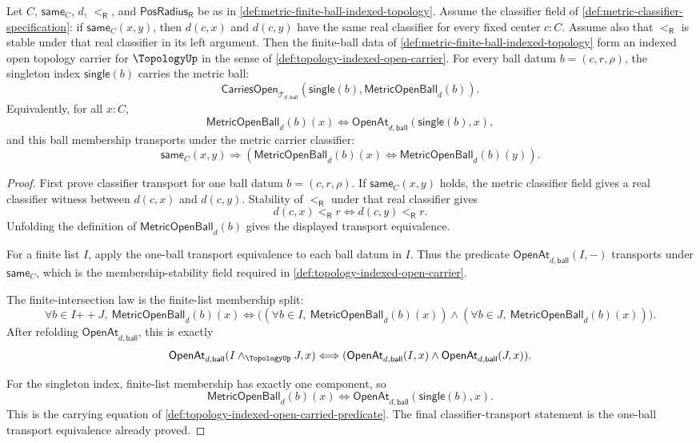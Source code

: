 \begin{theorem}
\label{thm:metric-balls-instantiate-indexed-topology-opens}
Let $C$, $\mathsf{same}_C$, $d$, $<_{\mathsf R}$, and $\mathsf{PosRadius}_{\mathsf R}$ be as in \autoref{def:metric-finite-ball-indexed-topology}. Assume the classifier field of \autoref{def:metric-classifier-specification}: if $\mathsf{same}_C(x,y)$, then $d(c,x)$ and $d(c,y)$ have the same real classifier for every fixed center $c:C$. Assume also that $<_{\mathsf R}$ is stable under that real classifier in its left argument. Then the finite-ball data of \autoref{def:metric-finite-ball-indexed-topology} form an indexed open topology carrier for $\TopologyUp$ in the sense of \autoref{def:topology-indexed-open-carrier}. For every ball datum $b=(c,r,\rho)$, the singleton index $\mathsf{single}(b)$ carries the metric ball:
$$
\mathsf{CarriesOpen}_{\mathcal{T}_{d,\mathsf{ball}}}
(\mathsf{single}(b),\mathsf{MetricOpenBall}_d(b)).
$$
Equivalently, for all $x:C$,
$$
\mathsf{MetricOpenBall}_d(b)(x)
\Longleftrightarrow
\mathsf{OpenAt}_{d,\mathsf{ball}}(\mathsf{single}(b),x),
$$
and this ball membership transports under the metric carrier classifier:
$$
\mathsf{same}_C(x,y)
\Longrightarrow
(\mathsf{MetricOpenBall}_d(b)(x)\Longleftrightarrow\mathsf{MetricOpenBall}_d(b)(y)).
$$
\end{theorem}
\begin{proof}
First prove classifier transport for one ball datum $b=(c,r,\rho)$. If $\mathsf{same}_C(x,y)$ holds, the metric classifier field gives a real classifier witness between $d(c,x)$ and $d(c,y)$. Stability of $<_{\mathsf R}$ under that real classifier gives
$$
d(c,x)<_{\mathsf R}r
\Longleftrightarrow
 d(c,y)<_{\mathsf R}r.
$$
Unfolding the definition of $\mathsf{MetricOpenBall}_d(b)$ gives the displayed transport equivalence.

For a finite list $I$, apply the one-ball transport equivalence to each ball datum in $I$. Thus the predicate $\mathsf{OpenAt}_{d,\mathsf{ball}}(I,-)$ transports under $\mathsf{same}_C$, which is the membership-stability field required in \autoref{def:topology-indexed-open-carrier}.

The finite-intersection law is the finite-list membership split:
$$
\forall b\in I\mathbin{+\!\!+}J,\ \mathsf{MetricOpenBall}_d(b)(x)
\Longleftrightarrow
\bigl((\forall b\in I,\ \mathsf{MetricOpenBall}_d(b)(x))\wedge
(\forall b\in J,\ \mathsf{MetricOpenBall}_d(b)(x))\bigr).
$$
After refolding $\mathsf{OpenAt}_{d,\mathsf{ball}}$, this is exactly
$$
\mathsf{OpenAt}_{d,\mathsf{ball}}(I\wedge_{\TopologyUp}J,x)
\Longleftrightarrow
(\mathsf{OpenAt}_{d,\mathsf{ball}}(I,x)\wedge
\mathsf{OpenAt}_{d,\mathsf{ball}}(J,x)).
$$

For the singleton index, finite-list membership has exactly one component, so
$$
\mathsf{MetricOpenBall}_d(b)(x)
\Longleftrightarrow
\mathsf{OpenAt}_{d,\mathsf{ball}}(\mathsf{single}(b),x).
$$
This is the carrying equation of \autoref{def:topology-indexed-open-carried-predicate}. The final classifier-transport statement is the one-ball transport equivalence already proved.
\end{proof}
